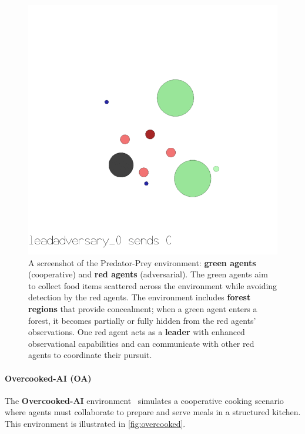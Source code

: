 \documentclass[pdflatex,sn-mathphys-num]{sn-jnl}%
\theoremstyle{thmstyleone}%
\theoremstyle{thmstyletwo}%
\theoremstyle{thmstylethree}%
\begin{document}
\begin{figure}[h!]
    \centering
    \includegraphics[width=0.6\linewidth]{figures/predator_prey.png}
    \caption{A screenshot of the Predator-Prey environment: \textbf{green agents} (cooperative) and \textbf{red agents} (adversarial). The green agents aim to collect food items scattered across the environment while avoiding detection by the red agents. The environment includes \textbf{forest regions} that provide concealment; when a green agent enters a forest, it becomes partially or fully hidden from the red agents' observations. One red agent acts as a \textbf{leader} with enhanced observational capabilities and can communicate with other red agents to coordinate their pursuit.}
    \label{fig:predator_prey}
\end{figure}

\paragraph{Overcooked-AI (OA)}
The \textbf{Overcooked-AI} environment~\cite{overcookedai} simulates a cooperative cooking scenario where agents must collaborate to prepare and serve meals in a structured kitchen. This environment is illustrated in \autoref{fig:overcooked}.
\end{document}
